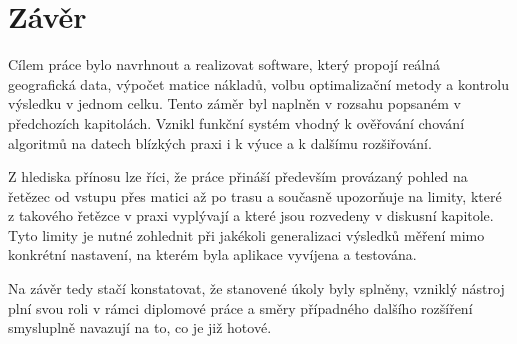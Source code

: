 \chapter{Závěr}

Cílem práce bylo navrhnout a realizovat software, který propojí reálná geografická data, výpočet matice nákladů, volbu optimalizační metody a kontrolu výsledku v jednom celku. Tento záměr byl naplněn v rozsahu popsaném v předchozích kapitolách. Vznikl funkční systém vhodný k ověřování chování algoritmů na datech blízkých praxi i k výuce a k dalšímu rozšiřování.

Z hlediska přínosu lze říci, že práce přináší především provázaný pohled na řetězec od vstupu přes matici až po trasu a současně upozorňuje na limity, které z takového řetězce v praxi vyplývají a které jsou rozvedeny v diskusní kapitole. Tyto limity je nutné zohlednit při jakékoli generalizaci výsledků měření mimo konkrétní nastavení, na kterém byla aplikace vyvíjena a testována.

Na závěr tedy stačí konstatovat, že stanovené úkoly byly splněny, vzniklý nástroj plní svou roli v rámci diplomové práce a směry případného dalšího rozšíření smysluplně navazují na to, co je již hotové.
